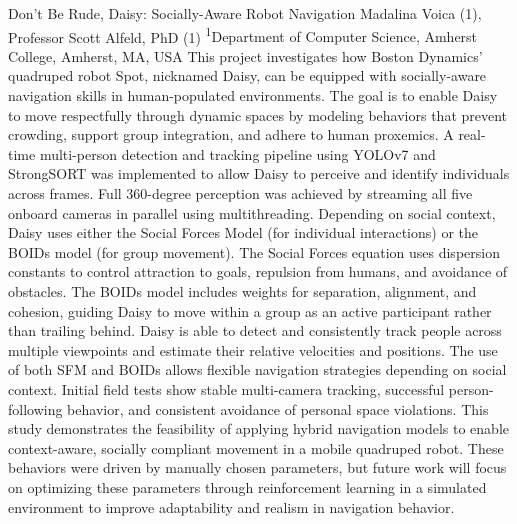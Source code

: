 \makeabstract
{
Don’t Be Rude, Daisy: Socially-Aware Robot Navigation
}
{
Madalina Voica (1), Professor Scott Alfeld, PhD (1)
}
{
\textsuperscript{1}Department of Computer Science, Amherst College, Amherst, MA, USA
}
{
This project investigates how Boston Dynamics’ quadruped robot Spot, nicknamed Daisy, can be equipped with socially-aware navigation skills in human-populated environments. The goal is to enable Daisy to move respectfully through dynamic spaces by modeling behaviors that prevent crowding, support group integration, and adhere to human proxemics.
}
{
A real-time multi-person detection and tracking pipeline using YOLOv7 and StrongSORT was implemented to allow Daisy to perceive and identify individuals across frames. Full 360-degree perception was achieved by streaming all five onboard cameras in parallel using multithreading. Depending on social context, Daisy uses either the Social Forces Model (for individual interactions) or the BOIDs model (for group movement). The Social Forces equation uses dispersion constants to control attraction to goals, repulsion from humans, and avoidance of obstacles. The BOIDs model includes weights for separation, alignment, and cohesion, guiding Daisy to move within a group as an active participant rather than trailing behind.
}
{
Daisy is able to detect and consistently track people across multiple viewpoints and estimate their relative velocities and positions. The use of both SFM and BOIDs allows flexible navigation strategies depending on social context. Initial field tests show stable multi-camera tracking, successful person-following behavior, and consistent avoidance of personal space violations.
}
{
This study demonstrates the feasibility of applying hybrid navigation models to enable context-aware, socially compliant movement in a mobile quadruped robot. These behaviors were driven by manually chosen parameters, but future work will focus on optimizing these parameters through reinforcement learning in a simulated environment to improve adaptability and realism in navigation behavior.
}

\newpage
